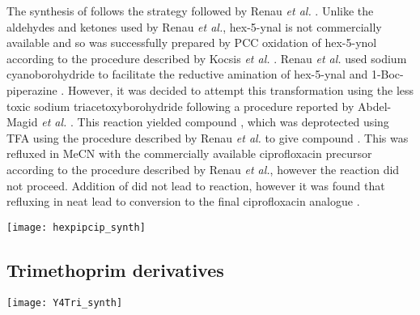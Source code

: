 The synthesis of  follows the strategy followed by Renau \textit{et al.} \cite{Renau1996}. Unlike the aldehydes and ketones used by Renau \textit{et al.}\cite{Renau1996}, hex-5-ynal  is not commercially available and so was successfully prepared by PCC oxidation of hex-5-ynol  according to the procedure described by Kocsis \textit{et al.} \cite{Kocsis2012}. Renau \textit{et al.}\cite{Renau1996} used sodium cyanoborohydride to facilitate the reductive amination of hex-5-ynal  and 1-Boc-piperazine . However, it was decided to attempt this transformation using the less toxic sodium triacetoxyborohydride following a procedure reported by Abdel-Magid \textit{et al.} \cite{Abdel-Magid1996}. This reaction yielded compound , which was deprotected using TFA using the procedure described by Renau \textit{et al.}\cite{Renau1996} to give compound . This was refluxed in MeCN with the commercially available ciprofloxacin precursor  according to the procedure described by Renau \textit{et al.}\cite{Renau1996}, however the reaction did not proceed. Addition of  did not lead to reaction, however it was found that refluxing in neat  lead to conversion to the final ciprofloxacin analogue .

\begin{scheme}[H]
	\begin{center}
		\texttt{[image: hexpipcip\_synth]}
		\caption{The synthesis of . 
		a) Pyridinium chlorochromate, , r.t., 5 h, 72 \%.
		b) , 1,2-dichloroethane, r.t., 10.5 h, 99 \%.
		c) TFA, r.t., 1 h, 100 \%.
		d) , reflux, 15 h, 21 \%. %
		\label{sch:hexpipcip_synth}}
	\end{center}
\end{scheme}

\subsection{Trimethoprim derivatives}

\begin{scheme}[H]
	\begin{center}
		\texttt{[image: Y4Tri\_synth]}
		\caption{\label{sch:}}
	\end{center}
\end{scheme}

